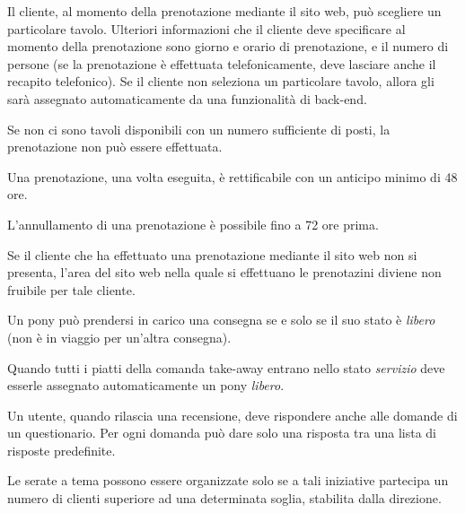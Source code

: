 \begin{enumbusinessrules}
\item Il cliente, al momento della prenotazione mediante il sito web, può scegliere un particolare tavolo. Ulteriori informazioni che il cliente deve specificare al momento della prenotazione sono giorno e orario di prenotazione, e il numero di persone (se la prenotazione è effettuata telefonicamente, deve lasciare anche il recapito telefonico). Se il cliente non seleziona un particolare tavolo, allora gli sarà assegnato automaticamente da una funzionalità di back-end.
\item Se non ci sono tavoli disponibili con un numero sufficiente di posti, la prenotazione non può essere effettuata.
\item Una prenotazione, una volta eseguita, è rettificabile con un anticipo minimo di 48 ore.
\item L'annullamento di una prenotazione è possibile fino a 72 ore prima.
\item Se il cliente che ha effettuato una prenotazione mediante il sito web non si presenta, l'area del sito web nella quale si effettuano le prenotazini diviene non fruibile per tale cliente.
\item Un pony può prendersi in carico una consegna se e solo se il suo stato è {\it libero} (non è in viaggio per un'altra consegna).
\item Quando tutti i piatti della comanda take-away entrano nello stato {\it servizio} deve esserle assegnato automaticamente un pony {\it libero}.
\item\label{br.surveyanswers} Un utente, quando rilascia una recensione, deve rispondere anche alle domande di un questionario. Per ogni domanda può dare solo una risposta tra una lista di risposte predefinite.
\item Le serate a tema possono essere organizzate solo se a tali iniziative partecipa un numero di clienti superiore ad una determinata soglia, stabilita dalla direzione.
\end{enumbusinessrules}
